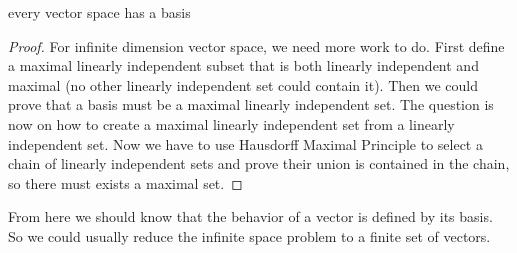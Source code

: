 \begin{theorem}
    every vector space has a basis
\end{theorem}
\begin{proof}
    For infinite dimension vector space, we need more work to do. First define a maximal linearly independent subset that is both linearly independent and maximal (no other linearly independent set could contain it). Then we could prove that a basis must be a maximal linearly independent set. The question is now on how to create a maximal linearly independent set from a linearly independent set. Now we have to use Hausdorff Maximal Principle to select a chain of linearly independent sets and prove their union is contained in the chain, so there must exists a maximal set.
\end{proof}


From here we should know that the behavior of a vector is defined by its basis. So we could usually reduce the infinite space problem to a finite set of vectors.

















